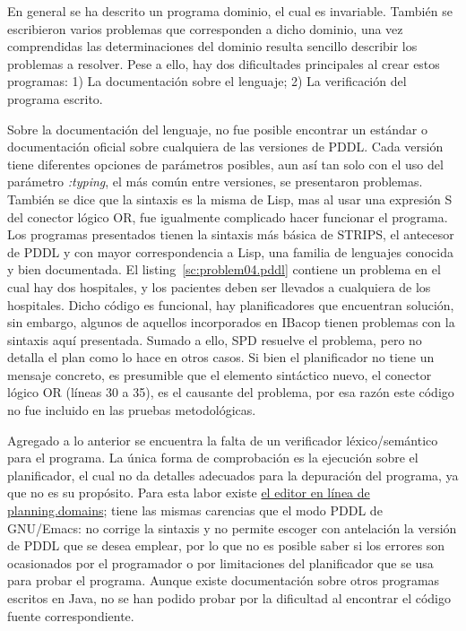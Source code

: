 \documentclass[a4paper,12pt,twocolumn]{article}
\begin{document}
En general se ha descrito un programa dominio, el cual es invariable. También se escribieron varios problemas que corresponden a dicho dominio, una vez comprendidas las determinaciones del dominio resulta sencillo describir los problemas a resolver. Pese a ello, hay dos dificultades principales al crear estos programas: 1) La documentación sobre el lenguaje; 2) La verificación del programa escrito.

Sobre la documentación del lenguaje, no fue posible encontrar un estándar o documentación oficial sobre cualquiera de las versiones de PDDL. Cada versión tiene diferentes opciones de parámetros posibles, aun así tan solo con el uso del parámetro \emph{:typing}, el más común entre versiones, se presentaron problemas. También se dice que la sintaxis es la misma de Lisp, mas al usar una expresión S del conector lógico OR, fue igualmente complicado hacer funcionar el programa. Los programas presentados tienen la sintaxis más básica de STRIPS, el antecesor de PDDL y con mayor correspondencia a Lisp, una familia de lenguajes conocida y bien documentada. El listing~\ref{sc:problem04.pddl} contiene un problema en el cual hay dos hospitales, y los pacientes deben ser llevados a cualquiera de los hospitales. Dicho código es funcional, hay planificadores que encuentran solución, sin embargo, algunos de aquellos incorporados en IBacop tienen problemas con la sintaxis aquí presentada. Sumado a ello, SPD resuelve el problema, pero no detalla el plan como lo hace en otros casos. Si bien el planificador no tiene un mensaje concreto, es presumible que el elemento sintáctico nuevo, el conector lógico OR (líneas 30 a 35), es el causante del problema, por esa razón este código no fue incluido en las pruebas metodológicas.



Agregado a lo anterior se encuentra la falta de un verificador léxico/semántico para el programa. La única forma de comprobación es la ejecución sobre el planificador, el cual no da detalles adecuados para la depuración del programa, ya que no es su propósito.  Para esta labor existe \href{http://editor.planning.domains/}{el editor en línea de planning.domains}; tiene las mismas carencias que el modo PDDL de GNU/Emacs: no corrige la sintaxis y no permite escoger con antelación la versión de PDDL que se desea emplear, por lo que no es posible saber si los errores son ocasionados por el programador o por limitaciones del planificador que se usa para probar el programa. Aunque existe documentación sobre otros programas escritos en Java, no se han podido probar por la dificultad al encontrar el código fuente correspondiente.
\end{document}

